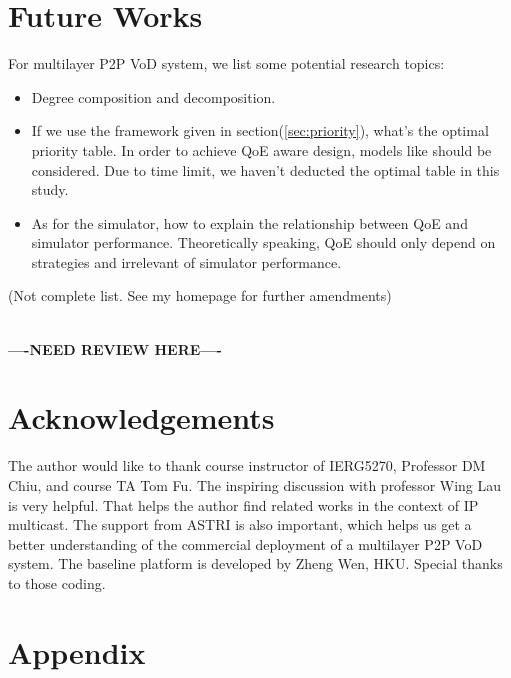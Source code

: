 \documentclass[11pt,a4paper]{article}
\newcommand{\question}{\textbf{\\----NEED REVIEW HERE----\\}}
\begin{document}
\section{Future Works}
\label{sec:future}


For multilayer P2P VoD system, we list some potential research topics:
\begin{itemize}
	\item Degree composition and decomposition. 
	\item If we use the framework given in section(\ref{sec:priority}), 
	what's the optimal priority table. In order to achieve QoE aware design, 
	models like \cite{wang2011-perceptual} should be considered. Due to 
	time limit, we haven't deducted the optimal table in this study. 
	\item As for the simulator, how to explain the relationship between 
	QoE and simulator performance. Theoretically speaking, QoE should only 
	depend on strategies and irrelevant of simulator performance. 
\end{itemize}
(Not complete list. See my homepage for further amendments)

\question

\section*{Acknowledgements}

The author would like to thank course instructor of IERG5270, Professor
DM Chiu, and course TA Tom Fu. The inspiring discussion with professor 
Wing Lau is very helpful. That helps the author find related works 
in the context of IP multicast. The support from ASTRI\cite{astri} is also important, 
which helps us get a better understanding of the commercial deployment
of a multilayer P2P VoD system. The baseline platform is developed 
by Zheng Wen, HKU. Special thanks to those coding. 


\pagebreak
\section*{Appendix}


{}

\end{document}
